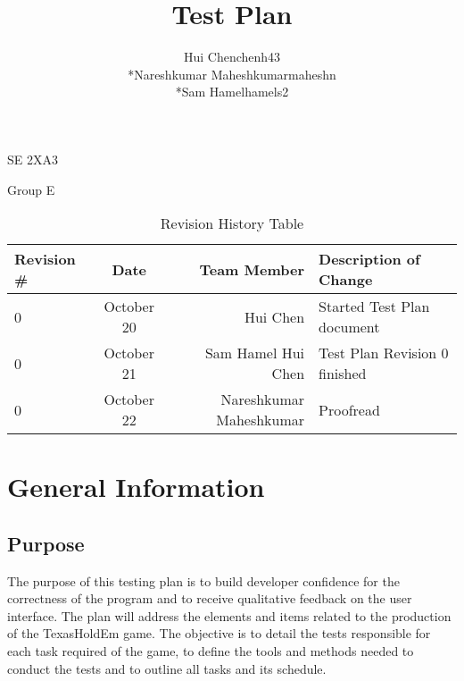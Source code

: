 \documentclass[12pt]{article}
\begin{document}
	\begin{titlepage}
	\title {Test Plan}
	\maketitle
		\begin{center}
		SE 2XA3\\
		\author{
		Hui Chen\hspace{128pt}chenh43	
		\\*Nareshkumar Maheshkumar\hspace{35pt}maheshn 
		\\*Sam Hamel\hspace{118pt}hamels2 \\
		}

		Group E
		\end{center}
	\end{titlepage}
	
	\newpage
	\tableofcontents
	\listoftables
	
	\newpage
	\begin{table}[h]
	\caption{Revision History Table}
	\begin{tabular}{|l|c|r|p{6cm}|}
  	\hline
  	Revision \# & Date & Team Member & Description of Change\\
  	\hline
  	0 & October 20 & Hui Chen & Started Test Plan document\\
  	\hline
  	0 & October 21 & Sam Hamel Hui Chen & Test Plan Revision 0 finished\\
  	\hline
  	0 & October 22 & Nareshkumar Maheshkumar & Proofread\\
  	\hline
	\end{tabular}
	\end{table}
	\newpage
	
	\section{General Information}
	\subsection{Purpose}    
	The purpose of this testing plan is to build developer confidence for the correctness of the program and to receive qualitative feedback on the user interface. The plan will address the elements and items related to the production of the TexasHoldEm game. The objective is to detail the tests responsible for each task required of the game, to define the tools and methods needed to conduct the tests and to outline all tasks and its schedule. 
\end{document}
